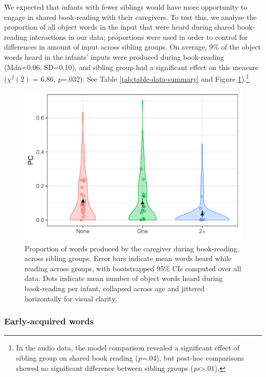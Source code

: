 \documentclass[
  english,
  man,floatsintext]{apa6}
\begin{document}
We expected that infants with fewer siblings would have more opportunity to engage in shared book-reading with their caregivers. To test this, we analyse the proportion of all object words in the input that were heard during shared book-reading interactions in our data; proportions were used in order to control for differences in amount of input across sibling groups. On average, 9\% of the object words heard in the infants' inputs were produced during book-reading (Mdn=0.06, SD=0.10), and sibling group had a significant effect on this measure (\(\chi^2 (2)\) = 6.86, \emph{p}=.032). See Table \ref{tab:table-data-summary} and Figure \ref{fig:Figure-reading}).\footnote{In the audio data, the model comparison revealed a significant effect of sibling group on shared book reading (\emph{p}=.04), but post-hoc comparisons showed no significant difference between sibling groups (\emph{ps}\textgreater.01).}

\begin{figure}
\centering
\includegraphics{SiblingsStudyText_files/figure-latex/Figure-reading-1.pdf}
\caption{\label{fig:Figure-reading}Proportion of words produced by the caregiver during book-reading, across sibling groups. Error bars indicate mean words heard while reading across groups, with bootstrapped 95\% CIs computed over all data. Dots indicate mean number of object words heard during book-reading per infant, collapsed across age and jittered horizontally for visual clarity.}
\end{figure}

\hypertarget{early-acquired-words}{%
\subsubsection{Early-acquired words}\label{early-acquired-words}}
\end{document}
